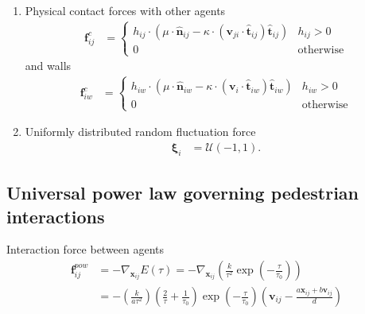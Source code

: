 \begin{enumerate}[label=\roman{enumi})]
\item 
Physical contact forces with other agents 
\begin{align}
\mathbf{f}_{ij}^{c} &= 
\begin{cases}
h_{ij} \cdot \left(\mu \cdot \hat{\mathbf{n}}_{ij} - \kappa \cdot \left(\mathbf{v}_{ji} \cdot \hat{\mathbf{t}}_{ij}\right) \hat{\mathbf{t}}_{ij}\right) & h_{ij} > 0 \\
0 & \text{otherwise}
\end{cases}
\end{align}
and walls
\begin{align}
\mathbf{f}_{iw}^{c} &= 
\begin{cases}
h_{iw} \cdot \left(\mu \cdot \hat{\mathbf{n}}_{iw} - \kappa \cdot (\mathbf{v}_{i} \cdot \hat{\mathbf{t}}_{iw}) \hat{\mathbf{t}}_{iw}\right) & h_{iw} > 0 \\
0 & \text{otherwise}
\end{cases}
\end{align}


\item 
Uniformly distributed random fluctuation force
\begin{align}
\boldsymbol{\xi}_{i} &= \boldsymbol{\mathcal{U}}(-1, 1).
\end{align}


\end{enumerate}


\subsection{Universal power law governing pedestrian interactions}
Interaction force between agents
\begin{align}
\mathbf{f}_{ij}^{pow} &= -\nabla_{\mathbf{x}_{ij}} E(\tau) 
= -\nabla_{\mathbf{x}_{ij}} \left(\frac{k}{\tau^{2}} \exp \left( -\frac{\tau}{\tau_{0}} \right) \right) \\
&= - \left(\frac{k}{a \tau^{2}}\right) 
\left(\frac{2}{\tau} + \frac{1}{\tau_{0}}\right) 
\exp\left (-\frac{\tau}{\tau_{0}}\right )
\left(\mathbf{v}_{ij} -\frac{a \mathbf{x}_{ij} + b \mathbf{v}_{ij}}{d} \right) 
\end{align}



